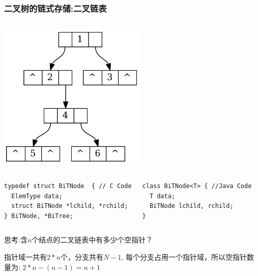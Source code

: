 \begin{frame}[fragile]
  \frametitle{二叉树的链式存储:二叉链表}
  \begin{columns}[T]
    \includegraphics[width=0.6\textwidth]{dot/tree-store-bilink.pdf}
  \end{columns}

  \small
  \begin{columns}
    \begin{verbatim}
typedef struct BiTNode  { // C Code
  ElemType data;
  struct BiTNode *lchild, *rchild;
} BiTNode, *BiTree;
    \end{verbatim}

    \begin{verbatim}
class BiTNode<T> { //Java Code
  T data;
  BiTNode lchild, rchild;
}
    \end{verbatim}
  \end{columns}

  思考:含$n$个结点的二叉链表中有多少个空指针？

  \pause
  指针域一共有$2*n$个，分支共有$N-1$,  每个分支占用一个指针域，所以空指针数量为:  $2*n - (n-1) = n+1$
\end{frame}

